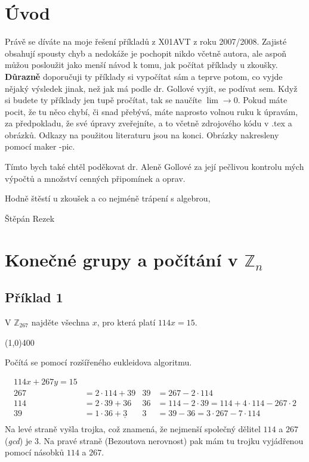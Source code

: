 \documentclass{article}
\begin{document}
\section*{Úvod}
Právě se díváte na moje řešení příkladů z X01AVT z roku 2007/2008. Zajisté obsahují spousty chyb a nedokáže je pochopit nikdo včetně autora, ale aspoň můžou posloužit jako menší návod k tomu, jak počítat příklady u zkoušky. \textbf{Důrazně} doporučuji ty příklady si vypočítat sám a teprve potom, co vyjde nějaký výsledek jinak, než jak má podle dr. Gollové vyjít, se podívat sem. Když si budete ty příklady jen tupě pročítat, tak se naučíte $\lim \rightarrow 0$. Pokud máte pocit, že tu něco chybí, či snad přebývá, máte naprosto volnou ruku k úpravám, za předpokladu, že své úpravy zveřejníte, a to včetně zdrojového kódu v .tex a obrázků. Odkazy na použitou literaturu jsou na konci. Obrázky nakresleny pomocí maker \Xy-pic.

Tímto bych také chtěl poděkovat dr. Aleně Gollové za její pečlivou kontrolu mých výpočtů a množství cenných připomínek a oprav.

Hodně štěstí u zkoušek a co nejméně trápení s algebrou,
\begin{flushright}
Štěpán Rezek
\end{flushright}

\tableofcontents

\clearpage

\section{Konečné grupy a počítání v $\mathbb{Z}_n$}

\subsection{Příklad 1}
V $\mathbb{Z}_{267}$ najděte všechna $x$, pro která platí $114x = 15$.

\line(1,0){400}

Počítá se pomocí rozšířeného eukleidova algoritmu.


\begin{align*}
114x + 267y = 15 & 								& 		&  \\
267 & = 2\cdot 114 + 39 					& 39	&= 267-2\cdot 114 \\
114 & = 2\cdot 39 + 36 						& 36 	&= 114-2\cdot 39 = 114 + 4\cdot 114 - 267 \cdot 2 \\
39  & = 1\cdot 36 + \underline{3}	& 3 	&= 39 - 36 = 3\cdot 267 - 7 \cdot 114 \\
\end{align*}
Na levé straně vyšla trojka, což znamená, že nejmenší společný dělitel $114$ a $267$ (\emph{gcd}) je $3$. Na pravé straně (Bezoutova nerovnost) pak mám tu trojku vyjádřenou pomocí násobků $114$ a $267$.
\end{document}
